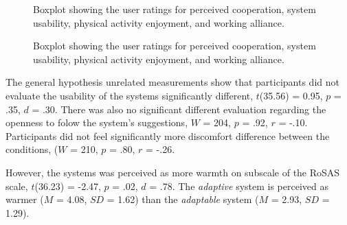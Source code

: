 \documentclass[twocolumn]{svjour3}          %
\begin{document}
\begin{figure}
\centering
 \caption{\label{fig:adapt:paes} Boxplot showing the user ratings for perceived cooperation, system usability, physical activity enjoyment, and working alliance.}\label{fig:unnamed-chunk-4}
\end{figure}

\begin{figure}[bt]
 \caption{\label{fig:adapt:paes} Boxplot showing the user ratings for perceived cooperation, system usability, physical activity enjoyment, and working alliance.}\label{fig:unnamed-chunk-4}
\end{figure}

% 
The general hypothesis unrelated measurements show that participants did not evaluate the usability of the systems significantly different, \(t\)(35.56) = 0.95, \(p\) = .35, \(d\) = .30. There was also no significant different evaluation regarding the openness to folow the system's suggestions, \(W\) = 204, \(p\) = .92, \(r\) = -.10. Participants did not feel significantly more discomfort  difference between the conditions, (\(W\) = 210, \(p\) = .80, \(r\) = -.26.

However, the systems was perceived as more warmth on subscale of the RoSAS scale, \(t\)(36.23) = -2.47, \(p\) = .02,
\(d\) = .78. The \textit{adaptive} system is perceived as warmer (\(M\) = 4.08,
\(SD\) = 1.62) than the \textit{adaptable} system (\(M\) = 2.93, \(SD\) = 1.29).

% 
\end{document}
